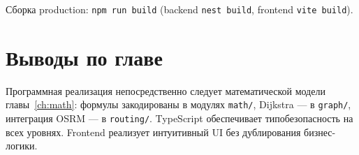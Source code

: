 Сборка production: \texttt{npm run build} (backend \texttt{nest build}, frontend
\texttt{vite build}).

\section{Выводы по главе}

Программная реализация непосредственно следует математической модели главы~\ref{ch:math}:
формулы закодированы в модулях \texttt{math/}, Dijkstra --- в \texttt{graph/},
интеграция OSRM --- в \texttt{routing/}. TypeScript обеспечивает типобезопасность
на всех уровнях. Frontend реализует интуитивный UI без дублирования бизнес-логики.
